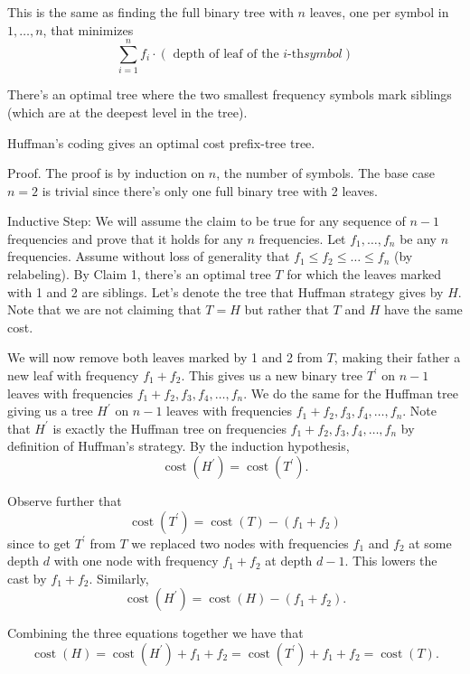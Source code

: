 \documentclass[scrartcl]{article}
\begin{document}
This is the same as finding the full binary tree with $n$ leaves, one per symbol in $1, \ldots, n$, that minimizes
$$
\sum_{i=1}^n f_i \cdot(\text { depth of leaf of the } i \text {-th} symbol) 
$$


\begin{claim}
    There's an optimal tree where the two smallest frequency symbols mark siblings (which are at the deepest level in the tree).
\end{claim}
\begin{claim}
    Huffman's coding gives an optimal cost prefix-tree tree.
\end{claim}
Proof. The proof is by induction on $n$, the number of symbols. The base case $n=2$ is trivial since there's only one full binary tree with 2 leaves.

Inductive Step: We will assume the claim to be true for any sequence of $n-1$ frequencies and prove that it holds for any $n$ frequencies. Let $f_1, \ldots, f_n$ be any $n$ frequencies. Assume without loss of generality that $f_1 \leq f_2 \leq \ldots \leq f_n$ (by relabeling). By Claim 1, there's an optimal tree $T$ for which the leaves marked with 1 and 2 are siblings. Let's denote the tree that Huffman strategy gives by $H$. Note that we are not claiming that $T=H$ but rather that $T$ and $H$ have the same cost.

We will now remove both leaves marked by 1 and 2 from $T$, making their father a new leaf with frequency $f_1+f_2$. This gives us a new binary tree $T^{\prime}$ on $n-1$ leaves with frequencies $f_1+f_2, f_3, f_4, \ldots, f_n$. We do the same for the Huffman tree giving us a tree $H^{\prime}$ on $n-1$ leaves with frequencies $f_1+f_2, f_3, f_4, \ldots, f_n$. Note that $H^{\prime}$ is exactly the Huffman tree on frequencies $f_1+f_2, f_3, f_4, \ldots, f_n$ by definition of Huffman's strategy. By the induction hypothesis,
$$
\operatorname{cost}\left(H^{\prime}\right)=\operatorname{cost}\left(T^{\prime}\right) .
$$

Observe further that
$$
\operatorname{cost}\left(T^{\prime}\right)=\operatorname{cost}(T)-\left(f_1+f_2\right)
$$
since to get $T^{\prime}$ from $T$ we replaced two nodes with frequencies $f_1$ and $f_2$ at some depth $d$ with one node with frequency $f_1+f_2$ at depth $d-1$. This lowers the cast by $f_1+f_2$. Similarly,
$$
\operatorname{cost}\left(H^{\prime}\right)=\operatorname{cost}(H)-\left(f_1+f_2\right) .
$$

Combining the three equations together we have that
$$
\operatorname{cost}(H)=\operatorname{cost}\left(H^{\prime}\right)+f_1+f_2=\operatorname{cost}\left(T^{\prime}\right)+f_1+f_2=\operatorname{cost}(T) .
$$
\end{document}
